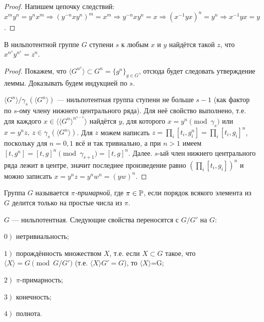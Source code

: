 \documentclass[10pt,a4paper]{article}%
\begin{document}
\begin{proof} Напишем цепочку следствий: $x^my^n=y^nx^m\Rightarrow
(y^{-n}xy^n)^m=x^m\Rightarrow y^{-n}xy^n=x\Rightarrow
(x^{-1}yx)^n=y^n\Rightarrow x^{-1}yx=y$. \end{proof}

\begin{theorem}В нильпотентной группе $G$ ступени $s$ к любым $x$ и
$y$ найдётся такой $z$, что $x^{n^s}y^{n^s}=z^n$.
\end{theorem}

\begin{proof} Покажем, что $\langle G^{n^s}\rangle\subset
G^n=\{g^n\}_{g\in G}$, отсюда будет следовать утверждение леммы.
Доказывать будем индукцией по $s$.

$\langle G^n\rangle/\gamma_s(\langle G^n\rangle)$ ---
нильпотентная группа ступени не больше $s-1$ (как фактор по
$s$-ому члену нижнего центрального ряда). Для неё свойство
выполнено, т.е. для каждого $x\in\langle\!\langle
G^n\rangle^{n^{s-1}}\rangle$ найдётся $y$, для которого
$x=y^n\pmod{\gamma_s}$ или $x=y^nz,~z\in\gamma_s(\langle
G^n\rangle)$. Для $z$ можем написать
$z=\prod\limits_i[t_i,g_i^n]=\prod\limits_i[t_i,g_i]^n$, поскольку
для $n=0,1$ всё и так тривиально, а при $n>1$ имеем
$[t,g^n]=[t,g]^n\pmod{\gamma_{s+1}}=[t,g]^n$. Далее. $s$-ый член
нижнего центрального ряда лежит в центре, значит последнее
произведение равно $(\prod\limits_i[t_i,g_i])^n$ и можно записать
$x=y^nz=y^nw^n=(yw)^n$.\end{proof}

Группа $G$ называется {\em
$\pi$-примарной}, где $\pi\in\mathbb P$,
если порядок всякого элемента из $G$ делится только на простые
числа из $\pi$.

\begin{theorem}
{$G$ --- нильпотентная. Следующие свойства переносятся с $G/G'$ на
$G$:
\par $\left.0\right)$ нетривиальность;
\par $\left.1\right)$ порождённость множеством $X$, т.е. если $X\subset
G$ такое, что $\langle X\rangle=G\pmod{G/G'}$ (т.е. ${\langle
X\rangle G'=G}$), то $\langle X\rangle$=G;
\par $\left.2\right)$ $\pi$-примарность;
\par $\left.3\right)$ конечность;
\par $\left.4\right)$ полнота.}\label{from quotient to group}
\end{theorem}
\end{document}
